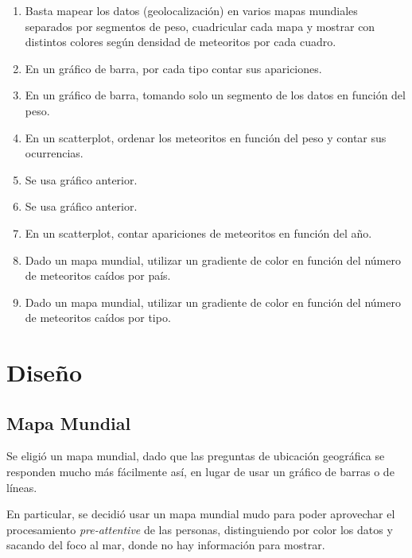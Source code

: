 \documentclass[letterpaper,10pt]{article}
\begin{document}
	\begin{enumerate}
		\item Basta mapear los datos (geolocalización) en varios mapas mundiales separados por segmentos de peso, cuadricular cada mapa y mostrar con distintos colores según densidad
		de meteoritos por cada cuadro.
		\item En un gráfico de barra, por cada tipo contar sus apariciones.
		\item En un gráfico de barra, tomando solo un segmento de los datos en función del peso.

		\item En un scatterplot, ordenar los meteoritos en función del peso y contar sus ocurrencias.
		\item Se usa gráfico anterior.
		\item Se usa gráfico anterior.

		\item En un scatterplot, contar apariciones de meteoritos en función del año.
		\item Dado un mapa mundial, utilizar un gradiente de color en función del número de meteoritos caídos por país.
		\item Dado un mapa mundial, utilizar un gradiente de color en función del número de meteoritos caídos por tipo.
	\end{enumerate}

	\newpage

	\section{Diseño}

	\subsection{Mapa Mundial}

	Se eligió un mapa mundial, dado que las preguntas de ubicación geográfica se responden mucho más fácilmente así, en lugar de usar un gráfico de barras o de líneas.

	En particular, se decidió usar un mapa mundial mudo para poder aprovechar el procesamiento \textit{pre-attentive} de las personas, distinguiendo por color los datos y sacando del
	foco al mar, donde no hay información para mostrar.
\end{document}
